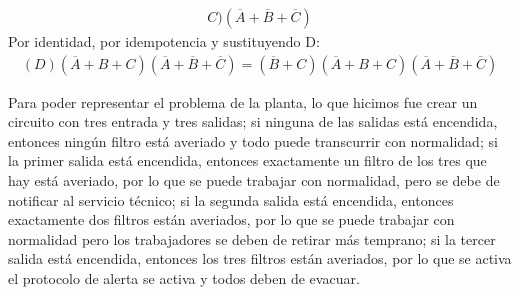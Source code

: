 \documentclass[answers]{exam}
\begin{document}
\begin{questions}
\begin{solution}
\begin{enumerate}
\begin{itemize}
\begin{gather*}
                      C)(\overline{A} + \overline{B} + \overline{C})
                    \end{gather*}
                    Por identidad, por idempotencia y sustituyendo D:
                    \begin{gather*}
                      (D)(\overline{A} + B + C)(\overline{A} + \overline{B} +%
                      \overline{C}) = (\overline{B} + C)(\overline{A} + B +%
                      C)(\overline{A} + \overline{B} + \overline{C})
                    \end{gather*}
            \end{itemize}
    \end{enumerate}
  \end{solution}

  \begin{solution}
    Para poder representar el problema de la planta, lo que hicimos fue crear un
    circuito con tres entrada y tres salidas; si ninguna de las salidas está
    encendida, entonces ningún filtro está averiado y todo puede transcurrir con
    normalidad; si la primer salida está encendida, entonces exactamente un
    filtro de los tres que hay está averiado, por lo que se puede trabajar con
    normalidad, pero se debe de notificar al servicio técnico; si la segunda
    salida está encendida, entonces exactamente dos filtros están averiados, por
    lo que se puede trabajar con normalidad pero los trabajadores se deben de
    retirar más temprano; si la tercer salida está encendida, entonces los tres
    filtros están averiados, por lo que se activa el protocolo de alerta se
    activa y todos deben de evacuar.


\end{solution}
\end{questions}
\end{document}
